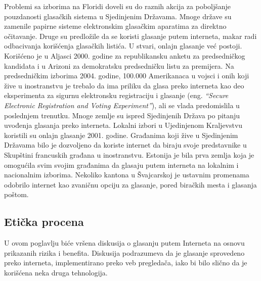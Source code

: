 \documentclass[a4paper]{article}
\begin{document}
{Problemi sa izborima na Floridi doveli su do raznih akcija za poboljšanje pouzdanosti glasačkih sistema u Sjedinjenim Državama. Mnoge države su zamenile papirne sisteme elektronskim glasačkim aparatima za direktno očitavanje. Druge su predložile da se koristi glasanje putem interneta, makar radi odbacivanja korišćenja glasačkih listića. U stvari, onlajn glasanje već postoji. Korišćeno je u Aljasci 2000. godine za republikansku anketu za predsedničkog kandidata i u Arizoni za demokratsku predsedničku listu za  premijera. Na predsedničkim izborima 2004. godine, 100.000 Amerikanaca u vojsci i onih koji žive u inostranstvu je trebalo da ima priliku da glasa preko interneta kao deo eksperimenta za sigurnu elektronsku registraciju i glasanje (eng. {\em “Secure Electronic Registration and Voting Experiment”}), ali se vlada predomislila u poslednjem trenutku.
Mnoge zemlje su ispred Sjedinjenih Država po pitanju uvođenja glasanja preko interneta. Lokalni izbori u Ujedinjenom Kraljevstvu koristili su onlajn glasanje 2001. godine. Građanima koji žive u Sjedinjenim Državama bilo je dozvoljeno da koriste internet da biraju svoje predstavnike u Skupštini francuskih građana u inostranstvu. Estonija je bila prva zemlja koja je omogućila svim svojim građanima da glasaju putem interneta na lokalnim i nacionalnim izborima. Nekoliko kantona u Švajcarskoj je ustavnim promenama odobrilo internet kao zvaničnu opciju za glasanje, pored biračkih mesta i glasanja poštom.

\subsection{Etička procena}
\label{subsec:Eticka procena}

U ovom poglavlju biće vršena diskusija o glasanju putem Interneta na osnovu prikazanih rizika i benefita. Diskusija podrazumeva da je glasanje sprovedeno preko interneta, implementirano preko veb pregledača, iako bi bilo slično da je korišćena neka druga tehnologija.\\


}
\end{document}
